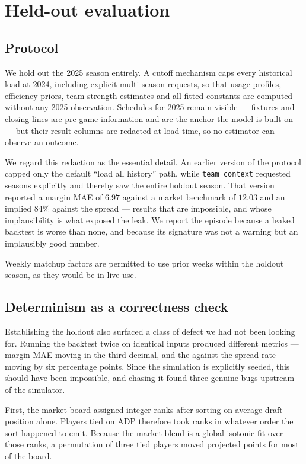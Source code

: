 \documentclass[11pt,a4paper]{article}
\begin{document}
\section{Held-out evaluation}

\subsection{Protocol}

We hold out the 2025 season entirely. A cutoff mechanism caps every historical
load at 2024, including explicit multi-season requests, so that usage profiles,
efficiency priors, team-strength estimates and all fitted constants are computed
without any 2025 observation. Schedules for 2025 remain visible --- fixtures and
closing lines are pre-game information and are the anchor the model is built on
--- but their result columns are redacted at load time, so no estimator can
observe an outcome.

We regard this redaction as the essential detail. An earlier version of the
protocol capped only the default ``load all history'' path, while
\texttt{team\_context} requested seasons explicitly and thereby saw the entire
holdout season. That version reported a margin MAE of $6.97$ against a market
benchmark of $12.03$ and an implied $84\%$ against the spread --- results that
are impossible, and whose implausibility is what exposed the leak. We report the
episode because a leaked backtest is worse than none, and because its signature
was not a warning but an implausibly good number.

Weekly matchup factors are permitted to use prior weeks within the holdout
season, as they would be in live use.

\subsection{Determinism as a correctness check}

Establishing the holdout also surfaced a class of defect we had not been looking
for. Running the backtest twice on identical inputs produced different metrics
--- margin MAE moving in the third decimal, and the against-the-spread rate
moving by six percentage points. Since the simulation is explicitly seeded, this
should have been impossible, and chasing it found three genuine bugs upstream of
the simulator.

First, the market board assigned integer ranks after sorting on average draft
position alone. Players tied on ADP therefore took ranks in whatever order the
sort happened to emit. Because the market blend is a global isotonic fit over
those ranks, a permutation of three tied players moved projected points for most
of the board.
\end{document}

